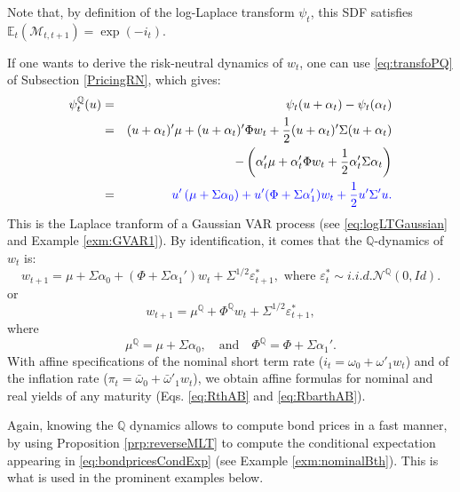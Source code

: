 \documentclass[
  12pt,
]{book}
\theoremstyle{definition}
\theoremstyle{definition}
\theoremstyle{definition}
\theoremstyle{definition}
\theoremstyle{remark}
\begin{document}
Note that, by definition of the log-Laplace transform \(\psi_t\), this SDF satisfies \(\mathbb{E}_t(\mathcal{M}_{t,t+1})=\exp(-i_t)\).

If one wants to derive the risk-neutral dynamics of \(w_t\), one can use \eqref{eq:transfoPQ} of Subsection \ref{PricingRN}, which gives:
\begin{eqnarray*}
\psi_t^{\mathbb{Q}}(u) &=& \psi_t(u + \alpha_t) - \psi_t(\alpha_t)\\
&=& (u + \alpha_t)'\mu + (u + \alpha_t)'\Phi w_t + \frac{1}{2}(u + \alpha_t)'\Sigma(u + \alpha_t) \\
&& - \left(\alpha_t'\mu + \alpha_t'\Phi w_t + \frac{1}{2}\alpha_t'\Sigma\alpha_t\right) \\
&=& \color{blue}{u' \left(\mu + \Sigma \alpha_0 \right) + u'(\Phi + \Sigma \alpha_1')w_t  + \frac{1}{2}u'\Sigma'u}.
\end{eqnarray*}
This is the Laplace tranform of a Gaussian VAR process (see \eqref{eq:logLTGaussian} and Example \ref{exm:GVAR1}). By identification, it comes that the \(\mathbb{Q}\)-dynamics of \(w_t\) is:
\[
w_{t+1} = \mu + \Sigma  \alpha_0 + (\Phi + \Sigma \alpha_1')  w_{t} + \Sigma^{1/2} \varepsilon^*_{t+1}, \mbox{ where } \varepsilon^*_{t} \sim  i.i.d. \mathcal{N}^{\mathbb{Q}}(0,Id).
\]
or
\begin{equation}
w_{t+1} = \mu^{\mathbb{Q}} + \Phi^{\mathbb{Q}} w_{t} + \Sigma^{1/2} \varepsilon^*_{t+1},\label{eq:GaussianQdyn}
\end{equation}
where
\[
\boxed{\mu^{\mathbb{Q}} = \mu + \Sigma  \alpha_0,\quad \mbox{and} \quad\Phi^{\mathbb{Q}}=\Phi + \Sigma \alpha_1'.}
\]
With affine specifications of the nominal short term rate (\(i_{t} = \omega_0 + \omega'_1 w_t\)) and of the inflation rate (\(\pi_{t} = \bar\omega_0 + \bar\omega'_1 w_t\)), we obtain affine formulas for nominal and real yields of any maturity (Eqs. \eqref{eq:RthAB} and \eqref{eq:RbarthAB}).

Again, knowing the \(\mathbb{Q}\) dynamics allows to compute bond prices in a fast manner, by using Proposition \ref{prp:reverseMLT} to compute the conditional expectation appearing in \eqref{eq:bondpricesCondExp} (see Example \ref{exm:nominalBth}). This is what is used in the prominent examples below.
\end{document}
